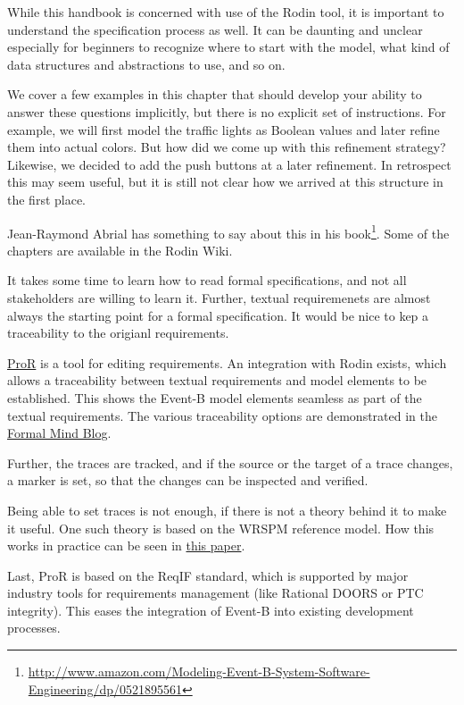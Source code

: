 While this handbook is concerned with use of the Rodin tool, it is important to understand the specification process as well.  It can be daunting and unclear especially for beginners to recognize where to start with the model, what kind of data structures and abstractions to use, and so on.

We cover a few examples in this chapter that should develop your ability to answer these questions implicitly, but there is no explicit set of instructions.  For example, we will first model the traffic lights as Boolean values and later refine them into actual colors.  But how did we come up with this refinement strategy?  Likewise, we decided to add the push buttons at a later refinement.  In retrospect this may seem useful, but it is still not clear how we arrived at this structure in the first place.

Jean-Raymond Abrial has something to say about this in his book\footnote{\url{http://www.amazon.com/Modeling-Event-B-System-Software-Engineering/dp/0521895561}}. Some of the chapters are available in the Rodin Wiki.

\begin{plugin-pror}

It takes some time to learn how to read formal specifications, and not all stakeholders are willing to learn it.  Further, textual requiremenets are almost always the starting point for a formal specification.  It would be nice to kep a traceability to the origianl requirements.

\href{http://wiki.event-b.org/index.php/ProR}{ProR} is a tool for editing requirements.  An integration with Rodin exists, which allows a traceability between textual requirements and model elements to be established.  This shows the Event-B model elements seamless as part of the textual requirements.  The various traceability options are demonstrated in the \href{http://www.formalmind.com/en/blog/using-rmf-integrate-your-models}{Formal Mind Blog}.

Further, the traces are tracked, and if the source or the target of a trace changes, a marker is set, so that the changes can be inspected and verified.

Being able to set traces is not enough, if there is not a theory behind it to make it useful.  One such theory is based on the WRSPM reference model.  How this works in practice can be seen in \href{http://www.stups.uni-duesseldorf.de/w/Special:Publication/RMF_Mark_Book_Jastram_2013}{this paper}.

Last, ProR is based on the ReqIF standard, which is supported by major industry tools for requirements management (like Rational DOORS or PTC integrity).  This eases the integration of Event-B into existing development processes.
\end{plugin-pror}

